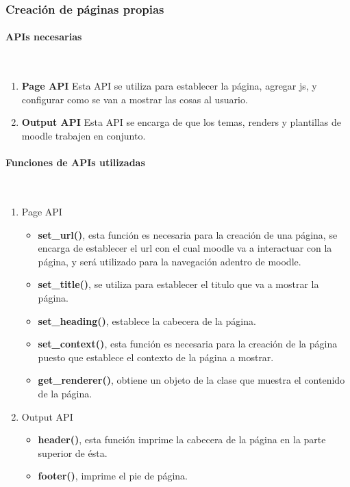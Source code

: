 
  	\subsubsection{Creación de páginas propias}

    \paragraph{APIs necesarias}\mbox{}\\


    \begin{enumerate}
      \item {\bf Page API}
        Esta API se utiliza para establecer la página, agregar js, y configurar como se van a mostrar las cosas al usuario.
        \item {\bf Output API}
          Esta API se encarga de que los temas, renders y plantillas de moodle trabajen en conjunto.
    \end{enumerate}

		\paragraph{Funciones de APIs utilizadas}\mbox{}\\

    \begin{enumerate}
      \item Page API

      \begin{itemize}
        \item {\bf set\_url()}, esta función es necesaria para la creación de una página, se encarga de establecer el url con el cual moodle va a interactuar con la página, y será utilizado para la navegación adentro de moodle.

        \item {\bf set\_title()}, se utiliza para establecer el titulo que va a mostrar la página.

        \item {\bf set\_heading()}, establece la cabecera de la página.

        \item {\bf set\_context()}, esta función es necesaria para la creación de la página puesto que establece el contexto de la página a mostrar.

        \item {\bf get\_renderer()}, obtiene un objeto de la clase que muestra el contenido de la página.
      \end{itemize}

      \item Output API

      \begin{itemize}
        \item 	{\bf header()}, esta función imprime la cabecera de la página en la parte superior de ésta.
        \item {\bf footer()}, imprime el pie de página.
      \end{itemize}

    \end{enumerate}


